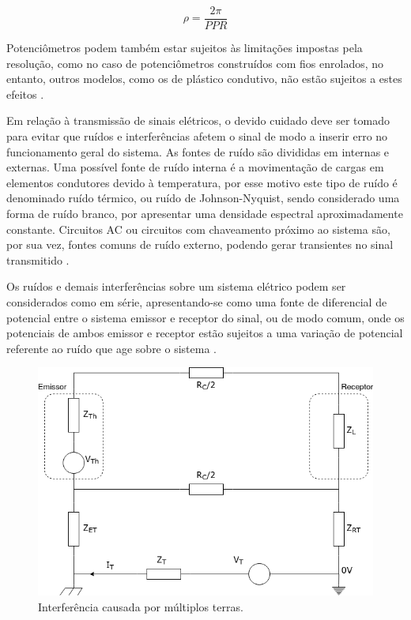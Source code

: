 \begin{equation}
    \label{eq:res_encoder}
    \rho = \frac{2\pi}{PPR}
\end{equation}

Potenciômetros podem também estar sujeitos às limitações impostas 
pela resolução, como no caso de potenciômetros construídos com fios 
enrolados, no entanto, outros modelos, como os de plástico condutivo,
não estão sujeitos a estes efeitos \cite{bentley2005principles}.

Em relação à transmissão de sinais elétricos, o devido cuidado deve
ser tomado para evitar que ruídos e interferências afetem o sinal de 
modo a inserir erro no funcionamento geral do sistema. 
As fontes de ruído são divididas em internas e externas. Uma possível fonte de
ruído interna é a movimentação de cargas em elementos condutores 
devido à temperatura, por esse motivo este tipo de ruído é denominado 
ruído térmico, ou ruído de Johnson-Nyquist, sendo considerado uma forma de
ruído branco, por apresentar uma densidade espectral aproximadamente 
constante. Circuitos AC ou circuitos com chaveamento próximo ao sistema 
são, por sua vez, fontes comuns de ruído externo, 
podendo gerar transientes no sinal transmitido \cite{bentley2005principles}.

Os ruídos e demais interferências sobre um sistema elétrico podem ser 
considerados como em série, apresentando-se como uma fonte de 
diferencial de potencial entre o sistema emissor e receptor do sinal, 
ou de modo comum, onde os potenciais de ambos emissor e receptor estão
sujeitos a uma variação de potencial referente ao ruído que age sobre o sistema \cite{bentley2005principles}.

\begin{figure}[h]
    \caption{Interferência causada por múltiplos terras.}    
    
    \begin{centering}
        \includegraphics[width=0.7\columnwidth]{images/fundamentos/Interferencia.png}
    \par\end{centering}

    \label{fig:interferencia}
\end{figure}


